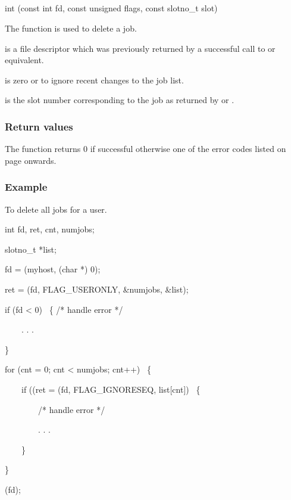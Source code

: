 \subsection{\funcnameXBjobdel{}}

\begin{expara}

int \funcnameXBjobdel{}(const int fd, const unsigned flags, const slotno\_t
slot)

\end{expara}

The function \funcXBjobdel{} is used to delete a job.

 is a file descriptor which was previously
returned by a successful call to \funcXBopen{} or equivalent.

 is zero or
 to ignore recent changes to
the job list.

 is the slot number corresponding to the job
as returned by \funcXBjoblist{} or
\funcXBjobfindslot{}.

\subsubsection{Return values}
The function returns 0 if successful otherwise one of the error codes
listed on page \pageref{errorcodes} onwards.

\subsubsection{Example}
To delete all jobs for a user.

\begin{expara}

int fd, ret, cnt, numjobs;

slotno\_t *list;

\bigskip


fd = \funcnameXBopen{}({\textquotedbl}myhost{\textquotedbl}, (char *) 0);

ret = \funcnameXBjoblist{}(fd, \constprefix{}FLAG\_USERONLY, \&numjobs, \&list);

if (fd {\textless} 0) \ \{ /* handle error */

\ \ \ \ . . .

\}

\bigskip


for (cnt = 0; cnt {\textless} numjobs; cnt++) \ \{

\ \ \ \ if ((ret = \funcnameXBjobdel{}(fd, \constprefix{}FLAG\_IGNORESEQ, list[cnt])
\ \{

\ \ \ \ \ \ \ \ /* handle error */

\ \ \ \ \ \ \ \ . . .

\ \ \ \ \}

\}

\bigskip


\funcnameXBclose{}(fd);

\end{expara}


